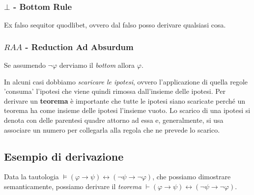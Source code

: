 \documentclass[a4paper,12pt]{report}
\newcommand\raa{RAA}
\begin{document}
\begin{multicols}{2}
\subsubsection{$\bot$ -  Bottom Rule}
Ex falso sequitor quodlibet, ovvero dal falso posso derivare qualsiasi cosa.
\begin{center}
\end{center}
\subsubsection{$\raa$ - Reduction Ad Absurdum}
Se assumendo $\neg\varphi$ derviamo il \emph{bottom} allora $\varphi$.
\begin{center}
\end{center}
\end{multicols}

In alcuni casi dobbiamo \emph{scaricare le ipotesi}, ovvero l'applicazione di quella regole 'consuma' l'ipotesi che viene quindi rimossa dall'insieme delle ipotesi. Per derivare un \textbf{teorema} \`{e} importante che tutte le ipotesi siano scaricate perch\'{e} un teorema ha come insieme delle ipotesi l'insieme vuoto. Lo scarico di una ipotesi si denota con delle parentesi quadre attorno ad essa e, generalmente, si usa associare un numero per collegarla alla regola che ne prevede lo scarico.

\newpage
\subsection{Esempio di derivazione}

Data la tautologia $\vDash (\varphi \to \psi) \leftrightarrow (\neg\psi \to \neg\varphi)$, che possiamo dimostrare semanticamente, possiamo derivare il \emph{teorema} $\vdash (\varphi \to \psi) \leftrightarrow (\neg\psi \to \neg\varphi)$.
\end{document}
